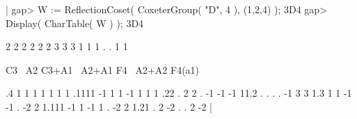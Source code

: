 |    gap> W := ReflectionCoset( CoxeterGroup( "D", 4 ), (1,2,4) );
    3D4
    gap> Display( CharTable( W ) );
    3D4
    
           2  2   2     2      2  2      3      3
           3  1   1     1      .  .      1      1
    
             C3 ~A2 C3+A1 ~A2+A1 F4 ~A2+A2 F4(a1)
    
    .4        1   1     1      1  1      1      1
    .1111    -1   1     1     -1  1      1      1
    .22       .   2     2      . -1     -1     -1
    11.2      .   .     .      . -1      3      3
    1.3       1   1    -1     -1  .     -2      2
    1.111    -1   1    -1      1  .     -2      2
    1.21      .   2    -2      .  .      2     -2
    |

